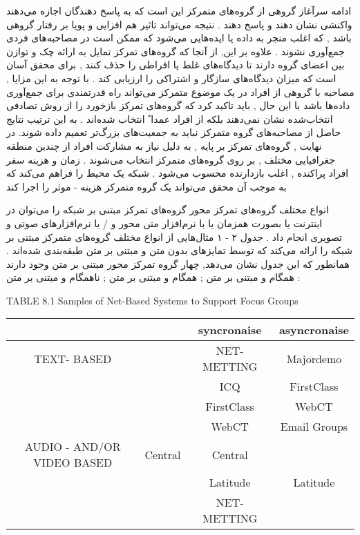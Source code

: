 \documentclass{beamer}
\begin{document}
\begin{persian}
\begin{frame}{ادامه سرآغاز}
گروهی از گروه‌های متمرکز این است که به پاسخ دهندگان اجازه می‌دهند واکنشی نشان دهند و پاسخ دهند . نتیجه می‌تواند تاثیر هم افزایی و پویا بر رفتار گروهی باشد , که اغلب منجر به داده یا ایده‌هایی می‌شود که ممکن است در مصاحبه‌های فردی جمع‌آوری نشوند . علاوه بر این, از آنجا که گروه‌های تمرکز تمایل به ارائه چک و توازن بین اعضای گروه دارند تا دیدگاه‌های غلط یا افراطی را حذف کنند , برای محقق آسان است که میزان دیدگاه‌های سازگار و اشتراکی را ارزیابی کند . با توجه به این مزایا , مصاحبه با گروهی از افراد در یک موضوع متمرکز می‌تواند راه قدرتمندی برای جمع‌آوری داده‌ها باشد با این حال , باید تاکید کرد که گروه‌های تمرکز بازخورد را از روش تصادفی انتخاب‌شده نشان نمی‌دهند بلکه از افراد عمدا ً انتخاب شده‌اند . به این ترتیب  نتایج حاصل از مصاحبه‌های گروه متمرکز نباید به جمعیت‌های بزرگ‌تر تعمیم داده شوند.
 در نهایت , گروه‌های تمرکز بر پایه , به دلیل نیاز به مشارکت افراد از چندین منطقه جغرافیایی مختلف , بر روی گروه‌های متمرکز انتخاب می‌شوند . زمان و هزینه سفر افراد پراکنده , اغلب بازدارنده محسوب می‌شود . شبکه یک محیط را فراهم می‌کند که به موجب آن محقق می‌تواند یک گروه متمرکز هزینه - موثر را اجرا کند 
\end{frame}

\begin{frame}{انواع مختلف گروه‌های تمرکز محور}
گروه‌های تمرکز مبتنی بر شبکه را می‌توان در اینترنت یا بصورت همزمان یا با نرم‌افزار متن محور و / یا نرم‌افزارهای صوتی و تصویری انجام داد . جدول ۲ - ۱ مثال‌هایی از انواع مختلف گروه‌های متمرکز مبتنی بر شبکه را ارائه می‌کند که توسط تمایزهای بدون متن و مبتنی بر متن طبقه‌بندی شده‌اند . همانطور که این جدول نشان می‌دهد, چهار گروه تمرکز محور مبتنی بر متن وجود دارند : همگام و مبتنی بر متن ; همگام و مبتنی بر متن ; ناهمگام و مبتنی بر متن

TABLE 8.1 Samples of Net-Based Systems to Support Focus  Groups\\
\begin{tabular}{cccc}\hline
	&                             &syncronaise      & asyncronaise\\\hline
	TEXT- BASED &                             & NET- METTING & Majordemo    \\\hline 
	&                             &     ICQ              & FirstClass       \\\hline
	&                             & FirstClass         & WebCT            \\\hline
	&                             &   WebCT           & Email Groups    \\\hline 
	AUDIO - AND/OR VIDEO BASED   &   Central           & Central             \\\hline
	&                             &   Latitude          &   Latitude            \\\hline
	&                             &  NET-METTING  &                            \\\hline
	

\end{tabular}
\end{frame}
\end{persian}
\end{document}
